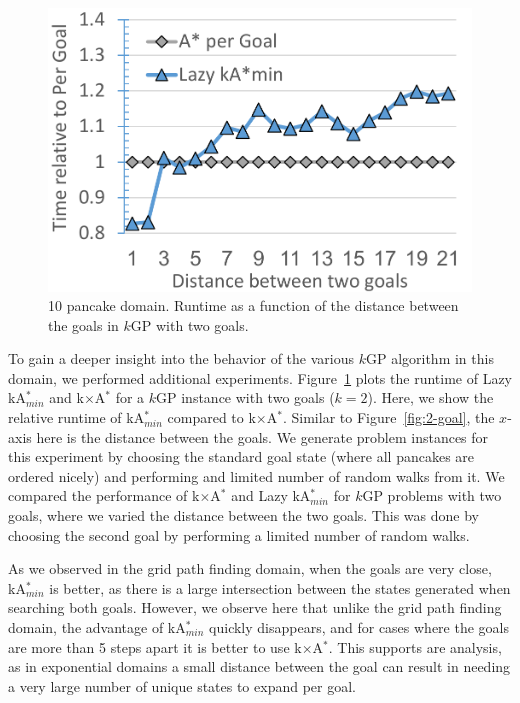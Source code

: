 \documentclass{aicom2e}
\newcommand{\kgs}{$k$GP}
\newcommand{\kastarmin}{kA$^*_{min}$}
\newcommand{\kxastar}{k$\times$A$^*$}
\begin{document}
\begin{figure}
    \includegraphics[width=\columnwidth]{pancake-goal-distance_cropped.pdf}
    \caption{10 pancake domain. Runtime as a function of the distance between the goals in \kgs{} with two goals.}
    \label{fig:2-goal-pancake}
\end{figure}


To gain a deeper insight into the behavior of the various \kgs{} algorithm in this domain, we performed additional experiments.  Figure~\ref{fig:2-goal-pancake} plots the runtime of Lazy \kastarmin{} and \kxastar{} for a \kgs{} instance with two goals ($k=2$). Here, we show the relative runtime of \kastarmin{} compared to \kxastar{}. Similar to Figure~\ref{fig:2-goal}, the $x$-axis here is the distance between the goals. We generate problem instances for this experiment by choosing the standard goal state (where all pancakes are ordered nicely) and performing and limited number of random walks from it. We compared the performance of \kxastar{} and Lazy \kastarmin{} for \kgs{} problems with two goals, where we varied the distance between the two goals. This was done by choosing the second goal by performing a limited number of random walks.


As we observed in the grid path finding domain, when the goals are very close, \kastarmin{} is better, as there is a large intersection between the states generated when searching both goals. However, we observe here that unlike the grid path finding domain, the advantage of \kastarmin{} quickly disappears, and for cases where the goals are more than 5 steps apart it is better to use \kxastar{}. This supports are analysis, as in exponential domains a small distance between the goal can result in needing a very large number of unique states to expand per goal.
\end{document}
